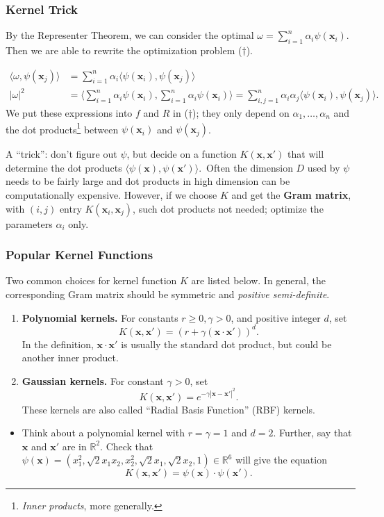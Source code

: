 \documentclass[smaller]{beamer}
\theoremstyle{example}
\newcommand{\x}{\textbf{x}}
\begin{document}
\begin{frame}
    \frametitle{Kernel Trick}
    By the Representer Theorem, we can consider the optimal $\omega = \sum_{i=1}^n\alpha_i\psi(\x_i)$. Then we are able to rewrite the optimization problem ($\dag$).

    \begin{align*}
        \langle\omega, \psi(\x_j)\rangle &= \sum_{i=1}^n\alpha_i\langle\psi(\x_i), \psi(\x_j)\rangle \\
        |\omega|^2                      &= \langle\sum_{i=1}^n\alpha_i\psi(\x_i), \sum_{i=1}^n\alpha_i\psi(\x_i)\rangle = \sum_{i,j = 1}^n \alpha_i\alpha_j\langle\psi(\x_i), \psi(\x_j)\rangle.
    \end{align*}
    We put these expressions into $f$ and $R$ in ($\dag$); they only depend on $\alpha_1,\ldots, \alpha_n$ and the dot products\footnote{\textit{Inner products}, more generally.} between $\psi(\x_i)$ and $\psi(\x_j)$. 

    \pause
    A ``trick'': don't figure out $\psi$, but decide on a function $K(\x, \x')$ that will determine the dot products $\langle\psi(\x), \psi(\x')\rangle$.\pause\ Often the dimension $D$ used by $\psi$ needs to be fairly large and dot products in high dimension can be computationally expensive. However, if we choose $K$ and get the \textbf{Gram matrix}, with $(i,j)$ entry $K(\x_i, \x_j)$, such dot products not needed; optimize the parameters $\alpha_i$ only.
\end{frame}

\begin{frame}
    \frametitle{Popular Kernel Functions}
    Two common choices for kernel function $K$ are listed below. In general, the corresponding Gram matrix should be symmetric and \textit{positive semi-definite}.

    \pause
    \begin{enumerate}
        \item \textbf{Polynomial kernels.} For constants $r\ge 0, \gamma>0$, and positive integer $d$, set 
            \[K(\x, \x') = (r + \gamma(\x\cdot\x'))^d.\]
        In the definition, $\x\cdot\x'$ is usually the standard dot product, but could be another inner product.
        \pause
        \item \textbf{Gaussian kernels.} For constant $\gamma > 0$, set 
            \[K(\x, \x') = e^{-\gamma|\x - \x'|^2}.\]
        These kernels are also called ``Radial Basis Function'' (RBF) kernels.
    \end{enumerate}

    \pause
    \begin{itemize}
        \item Think about a polynomial kernel with $r=\gamma=1$ and $d = 2$. Further, say that $\x$ and $\x'$ are in $\mathbb R^2$. Check that $\psi(\x) = (x_1^2, \sqrt{2}x_1x_2, x_2^2, \sqrt{2}x_1, \sqrt{2}x_2, 1)\in\mathbb R^6$ will give the equation 
            \[K(\x, \x') = \psi(\x)\cdot\psi(\x').\]
    \end{itemize}

\end{frame}
\end{document}
